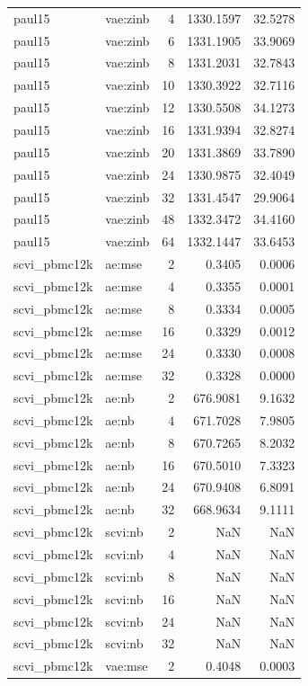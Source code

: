 \begin{tabular}{llrrr}
paul15 & vae:zinb & 4 & 1330.1597 & 32.5278 \\
paul15 & vae:zinb & 6 & 1331.1905 & 33.9069 \\
paul15 & vae:zinb & 8 & 1331.2031 & 32.7843 \\
paul15 & vae:zinb & 10 & 1330.3922 & 32.7116 \\
paul15 & vae:zinb & 12 & 1330.5508 & 34.1273 \\
paul15 & vae:zinb & 16 & 1331.9394 & 32.8274 \\
paul15 & vae:zinb & 20 & 1331.3869 & 33.7890 \\
paul15 & vae:zinb & 24 & 1330.9875 & 32.4049 \\
paul15 & vae:zinb & 32 & 1331.4547 & 29.9064 \\
paul15 & vae:zinb & 48 & 1332.3472 & 34.4160 \\
paul15 & vae:zinb & 64 & 1332.1447 & 33.6453 \\
scvi\_pbmc12k & ae:mse & 2 & 0.3405 & 0.0006 \\
scvi\_pbmc12k & ae:mse & 4 & 0.3355 & 0.0001 \\
scvi\_pbmc12k & ae:mse & 8 & 0.3334 & 0.0005 \\
scvi\_pbmc12k & ae:mse & 16 & 0.3329 & 0.0012 \\
scvi\_pbmc12k & ae:mse & 24 & 0.3330 & 0.0008 \\
scvi\_pbmc12k & ae:mse & 32 & 0.3328 & 0.0000 \\
scvi\_pbmc12k & ae:nb & 2 & 676.9081 & 9.1632 \\
scvi\_pbmc12k & ae:nb & 4 & 671.7028 & 7.9805 \\
scvi\_pbmc12k & ae:nb & 8 & 670.7265 & 8.2032 \\
scvi\_pbmc12k & ae:nb & 16 & 670.5010 & 7.3323 \\
scvi\_pbmc12k & ae:nb & 24 & 670.9408 & 6.8091 \\
scvi\_pbmc12k & ae:nb & 32 & 668.9634 & 9.1111 \\
scvi\_pbmc12k & scvi:nb & 2 & NaN & NaN \\
scvi\_pbmc12k & scvi:nb & 4 & NaN & NaN \\
scvi\_pbmc12k & scvi:nb & 8 & NaN & NaN \\
scvi\_pbmc12k & scvi:nb & 16 & NaN & NaN \\
scvi\_pbmc12k & scvi:nb & 24 & NaN & NaN \\
scvi\_pbmc12k & scvi:nb & 32 & NaN & NaN \\
scvi\_pbmc12k & vae:mse & 2 & 0.4048 & 0.0003 \\

\end{tabular}
